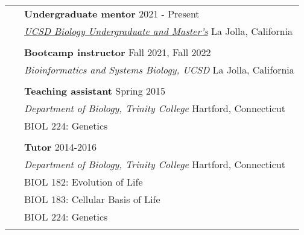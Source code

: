 \documentclass[letterpaper, 11pt]{article}
\begin{document}
\begin{longtable}{p{1.6in}p{4.9in}}
  

{\color{OliveGreen}{Teaching / Mentorship}} 
& \textbf{Undergraduate mentor} \hfill 2021 - Present \\
& \href{https://www.bummpucsd.org/about}{\textit{UCSD Biology Undergraduate and Master's}} \hfill La Jolla, California \\
& \\

& \textbf{Bootcamp instructor} \hfill Fall 2021, Fall 2022 \\\
& \textit{Bioinformatics and Systems Biology, UCSD} \hfill La Jolla, California \\
& \\

& \textbf{Teaching assistant} \hfill Spring 2015 \\
& \textit{Department of Biology, Trinity College} \hfill Hartford, Connecticut \\
& BIOL 224: Genetics \\
& \\

& \textbf{Tutor} \hfill 2014-2016 \\
& \textit{Department of Biology, Trinity College} \hfill Hartford, Connecticut \\
& BIOL 182: Evolution of Life \\
& BIOL 183: Cellular Basis of Life \\
& BIOL 224: Genetics \\
& \\




\end{longtable}
\end{document}
